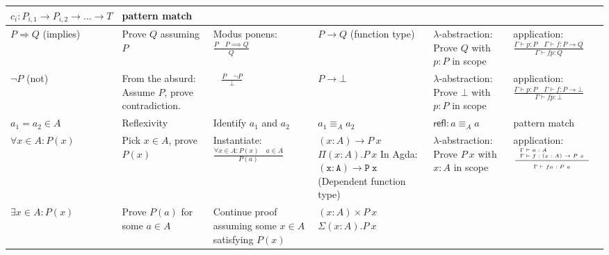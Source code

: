 \documentclass[a4paper]{article}
\newcommand{\name}[1]{\mathsf{#1}}
\newcommand{\sez}{\vdash}
\newcommand{\inferenceright}[3]{\dfrac{\begin{array}{l l}#1\end{array}}{\begin{array}{l l}#2\end{array}} #3}
\newcommand{\inference}[3]{\inferenceright{#1}{#2}{\text{#3}}}
\theoremstyle{definition}
\begin{document}
\begin{center}
\begin{tabular}{| p{} | p{} | p{} || p{} | p{} | p{} |}
	  $c_i : P_{i, 1} \to P_{i, 2} \to \ldots \to T$
	& pattern match
	\\ \hline
	$P \Rightarrow Q$ \newline (implies)
	& Prove $Q$ assuming $P$
	& Modus ponens: \newline
	  $\frac{P \quad P \implies Q}{Q}$
	& $P \to Q$ \newline (function type)
	& $\lambda$-abstraction: \newline
	  Prove $Q$ with \newline $p : P$ in scope
	& application: \newline
	  $\frac{\Gamma \sez p : P \quad \Gamma \sez f : P \to Q}{\Gamma \sez fp : Q}$
	\\ \hline
	$\lnot P$ (not)
	& From the absurd: \newline Assume $P$, prove contradiction.
	& {~} \newline $\frac{P \quad \lnot P}{\bot}$
	& $P \to \bot$
	& $\lambda$-abstraction: \newline
	  Prove $\bot$ with \newline $p : P$ in scope
	& application: \newline
	  $\frac{\Gamma \sez p : P \quad \Gamma \sez f : P \to \bot}{\Gamma \sez fp : \bot}$
	\\ \hline
	$a_1 {=} a_2 \in A$
	& Reflexivity
	& Identify $a_1$ and $a_2$
	& $a_1 \equiv_A a_2$
	& $\name{refl} : a \equiv_A a$
	& pattern match
	\\ \hline
	$\forall x \in A : P(x)$
	& Pick $x \in A$, \newline prove $P(x)$
	& Instantiate: \newline
	  $\frac{\forall x \in A : P(x) \quad a \in A}{P(a)}$
	& $(x : A) \to P~x$ \newline
	  $\Pi(x : A).P~x$ \newline
	  In Agda: \newline $\mathtt{(x : A)} \to \mathtt{P~x}$ \newline
	  (Dependent function type)
	& $\lambda$-abstraction: Prove $P~x$ with $x : A$ in scope
	& application: \newline
	  $\tiny \inference{\Gamma \sez a : A \\ \Gamma \sez f : (x : A) \to P~x}{\Gamma \sez fa : P~a}{}$
	\\ \hline
	$\exists x \in A : P(x)$
	& Prove $P(a)$ for some $a \in A$
	& Continue proof assuming some $x \in A$ satisfying $P(x)$
	& $(x : A) \times P~x$ \newline
	  $\Sigma(x : A).P~x$ \newline

\end{tabular}
\end{center}
\end{document}
